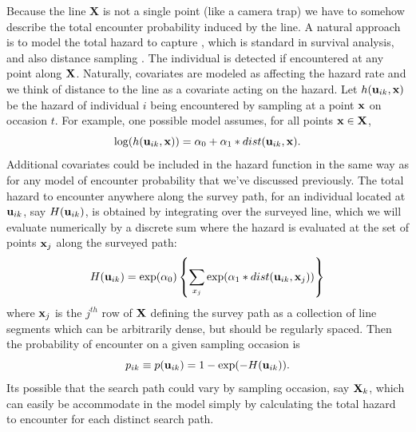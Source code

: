 Because the line {\bf X} is not a single point (like a camera trap) we
have to somehow describe the total encounter probability induced by
the line. A natural approach is to model the total hazard to capture
\citep{borchers_efford:2008}, which is standard in survival analysis,
and also distance sampling \citep{hayes_buckland:1983,
  skaug_schweder:1999}.  The individual is detected 
if encountered at any point along ${\bf X}$. Naturally,
covariates are modeled as affecting the hazard rate and we think of
distance to the line as a covariate acting on the hazard. Let $h({\bf
  u}_{ik},{\bf x})$ be the hazard of individual $i$ being encountered
by sampling at a point ${\bf x}$ on occasion $t$.  For example, one
possible model assumes, for all points ${\bf x} \in {\bf X}$,
\begin{equation}
\log(h({\bf u}_{ik},{\bf x})) = \alpha_{0} + \alpha_{1}*dist({\bf u}_{ik},{\bf x}).
\label{eq.hazard}
\end{equation}
Additional covariates could be included in the hazard function in the
same way as for any model of encounter probability that we've
discussed previously.  The total hazard to encounter anywhere along
the survey path, for an individual located at ${\bf u}_{ik}$, say
$H({\bf u}_{ik})$, is obtained by integrating over the surveyed line,
which we will evaluate numerically by a discrete sum where the hazard
is evaluated at the set of points ${\bf x}_{j}$ along the surveyed
path:
\begin{equation}
H({\bf u}_{ik}) =  \exp(\alpha_{0}) \left\{ \sum_{x_{j}}  \exp(\alpha_{1}*dist({\bf
    u}_{ik},{\bf x}_{j})) \right\}
\label{eq.totalhazard}
\end{equation}
where ${\bf x}_{j}$ is the $j^{th}$ row of ${\bf X}$ defining the
survey path as a collection of line segments which can be arbitrarily
dense, but should be regularly spaced.  Then the probability of
encounter on a given sampling occasion  is
\begin{equation}
p_{ik} \equiv p({\bf u}_{ik}) = 1- \exp(-H({\bf u}_{ik})).
\label{search-encounter.eq.encounterprob}
\end{equation}
Its possible that the search path could vary by sampling occasion, say
${\bf X}_{k}$, which can easily be accommodate in the model simply by
calculating the total hazard to encounter for each distinct search
path.

